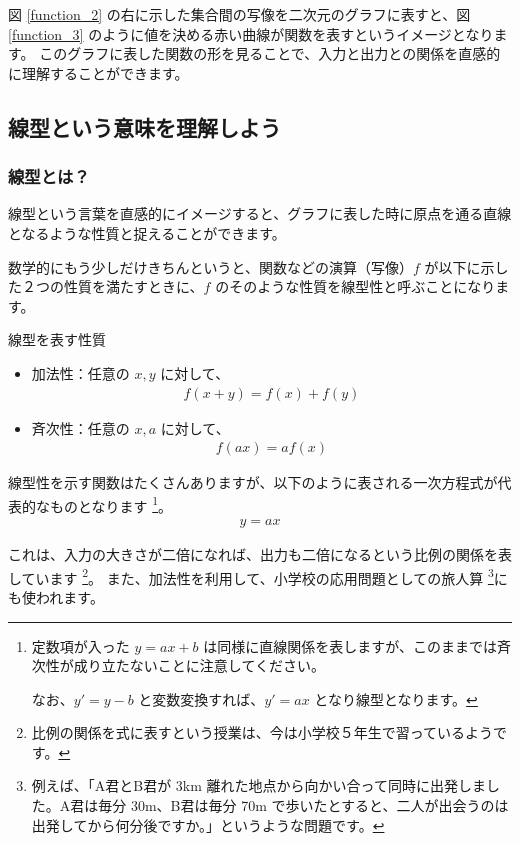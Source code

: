 \documentclass[uplatex,dvipdfmx,a4paper,11pt]{jsreport}
\begin{document}
図 \ref{function_2} の右に示した集合間の写像を二次元のグラフに表すと、図 \ref{function_3} のように値を決める赤い曲線が関数を表すというイメージとなります。
このグラフに表した関数の形を見ることで、入力と出力との関係を直感的に理解することができます。

\subsection{線型という意味を理解しよう}

\subsubsection{線型とは？}
線型という言葉を直感的にイメージすると、グラフに表した時に原点を通る直線となるような性質と捉えることができます。

数学的にもう少しだけきちんというと、関数などの演算（写像）$f$ が以下に示した２つの性質を満たすときに、$f$ のそのような性質を線型性と呼ぶことになります。
\large
\begin{itembox}[l]{線型を表す性質}
	\begin{itemize}
		\item 加法性：任意の $x,y$ に対して、
		\begin{align*}
			f(x+y)=f(x)+f(y)
		\end{align*}
		\item 斉次性：任意の $x,a$ に対して、
		\begin{align*}
			f(ax)=af(x)
		\end{align*}
	\end{itemize}
\end{itembox}
\normalsize

線型性を示す関数はたくさんありますが、以下のように表される一次方程式が代表的なものとなります
\footnote{
	定数項が入った $y=ax+b$ は同様に直線関係を表しますが、このままでは斉次性が成り立たないことに注意してください。

	なお、$y'=y-b$ と変数変換すれば、$y'=ax$ となり線型となります。
}。
\begin{align*}
	y=ax
\end{align*}

これは、入力の大きさが二倍になれば、出力も二倍になるという比例の関係を表しています
\footnote{
	比例の関係を式に表すという授業は、今は小学校５年生で習っているようです。
}。
また、加法性を利用して、小学校の応用問題としての旅人算
\footnote{
	例えば、「A君とB君が 3km 離れた地点から向かい合って同時に出発しました。A君は毎分 30m、B君は毎分 70m で歩いたとすると、二人が出会うのは出発してから何分後ですか。」というような問題です。
}にも使われます。
\end{document}
